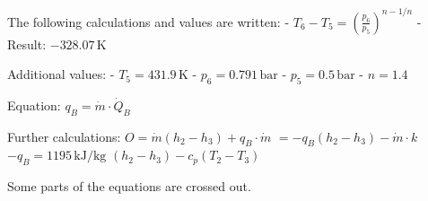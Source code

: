 The following calculations and values are written:  
- \( T_6 - T_5 = \left( \frac{p_6}{p_5} \right)^{n-1/n} \)  
- Result: \( -328.07 \, \text{K} \)  

Additional values:  
- \( T_5 = 431.9 \, \text{K} \)  
- \( p_6 = 0.791 \, \text{bar} \)  
- \( p_5 = 0.5 \, \text{bar} \)  
- \( n = 1.4 \)  

Equation:  
\( q_B = \dot{m} \cdot \dot{Q}_B \)  

Further calculations:  
\( O = \dot{m} (h_2 - h_3) + q_B \cdot \dot{m} \)  
\( = -q_B (h_2 - h_3) - \dot{m} \cdot k \)  
\( -q_B = 1195 \, \text{kJ/kg} \)  
\( (h_2 - h_3) - c_p (T_2 - T_3) \)  

Some parts of the equations are crossed out.